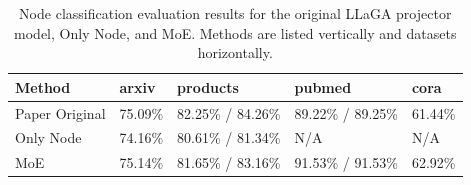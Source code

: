 
\begin{table}[htbp]
\centering
\caption{Node classification evaluation results for the original LLaGA projector model, Only Node, and MoE. Methods are listed vertically and datasets horizontally.}
\label{tab:paper-nodeonly-moe-results}
\begin{tabular}{lllll}
\toprule
Method & arxiv & products & pubmed & cora \\
\midrule
Paper Original & 75.09\% & 82.25\% / 84.26\% & 89.22\% / 89.25\% & 61.44\% \\
Only Node      & 74.16\% & 80.61\% / 81.34\% & N/A               & N/A \\
MoE            & 75.14\% & 81.65\% / 83.16\% & 91.53\% / 91.53\% & 62.92\% \\
\bottomrule
\end{tabular}
\end{table}

